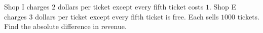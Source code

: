 Shop I charges $2$ dollars per ticket except every fifth ticket costs $1$. Shop E charges $3$ dollars per ticket except every fifth ticket is free. Each sells $1000$ tickets. Find the absolute difference in revenue.
